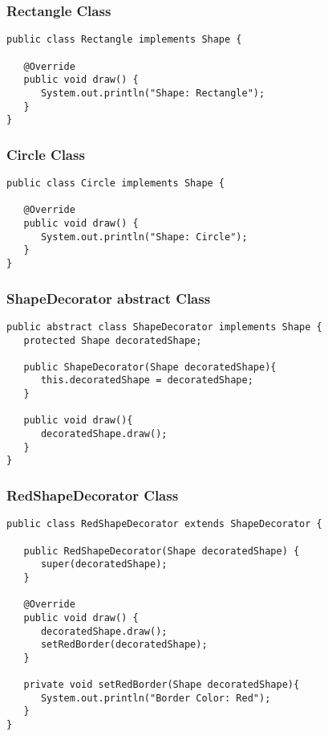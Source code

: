 \subsubsection{Rectangle Class}

\begin{verbatim}
public class Rectangle implements Shape {

   @Override
   public void draw() {
      System.out.println("Shape: Rectangle");
   }
}
\end{verbatim}

\subsubsection{Circle Class}

\begin{verbatim}
public class Circle implements Shape {

   @Override
   public void draw() {
      System.out.println("Shape: Circle");
   }
}
\end{verbatim}

\subsubsection{ShapeDecorator abstract Class}

\begin{verbatim}
public abstract class ShapeDecorator implements Shape {
   protected Shape decoratedShape;

   public ShapeDecorator(Shape decoratedShape){
      this.decoratedShape = decoratedShape;
   }

   public void draw(){
      decoratedShape.draw();
   }	
}
\end{verbatim}

\subsubsection{RedShapeDecorator Class}

\begin{verbatim}
public class RedShapeDecorator extends ShapeDecorator {

   public RedShapeDecorator(Shape decoratedShape) {
      super(decoratedShape);		
   }

   @Override
   public void draw() {
      decoratedShape.draw();	       
      setRedBorder(decoratedShape);
   }

   private void setRedBorder(Shape decoratedShape){
      System.out.println("Border Color: Red");
   }
}
\end{verbatim}

